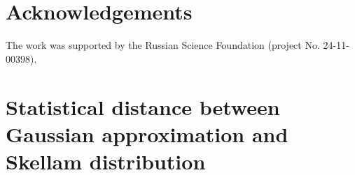 \documentclass[%
reprint,
superscriptaddress,
 amsmath,amssymb,amsfonts,
 aps,
 pra,
 longbibliography
]{revtex4-2}
\begin{document}








\section*{Acknowledgements}
The work was supported by the Russian Science Foundation (project No. 24-11-00398).

\appendix
\section{Statistical distance between Gaussian approximation and Skellam distribution}
\label{sec:appendix_numerical}
\end{document}
